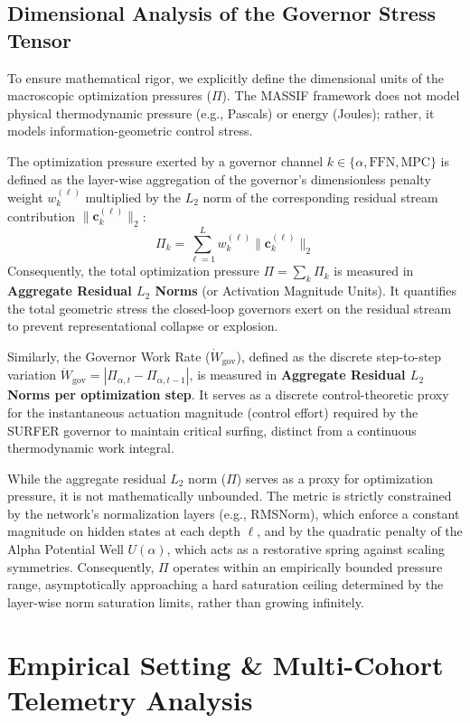 \documentclass[11pt]{article}
\begin{document}
\subsection{Dimensional Analysis of the Governor Stress Tensor}
To ensure mathematical rigor, we explicitly define the dimensional units of the macroscopic optimization pressures ($\Pi$). The MASSIF framework does not model physical thermodynamic pressure (e.g., Pascals) or energy (Joules); rather, it models information-geometric control stress.

The optimization pressure exerted by a governor channel $k \in \{\alpha, \text{FFN}, \text{MPC}\}$ is defined as the layer-wise aggregation of the governor's dimensionless penalty weight $w_k^{(\ell)}$ multiplied by the $L_2$ norm of the corresponding residual stream contribution $\|\mathbf{c}_k^{(\ell)}\|_2$:
\begin{equation}
\Pi_k = \sum_{\ell=1}^L w_k^{(\ell)} \|\mathbf{c}_k^{(\ell)}\|_2
\end{equation}
Consequently, the total optimization pressure $\Pi = \sum_k \Pi_k$ is measured in \textbf{Aggregate Residual $L_2$ Norms} (or Activation Magnitude Units). It quantifies the total geometric stress the closed-loop governors exert on the residual stream to prevent representational collapse or explosion.

Similarly, the Governor Work Rate ($\dot{W}_{\text{gov}}$), defined as the discrete step-to-step variation $\dot{W}_{\text{gov}} = |\Pi_{\alpha, t} - \Pi_{\alpha, t-1}|$, is measured in \textbf{Aggregate Residual $L_2$ Norms per optimization step}. It serves as a discrete control-theoretic proxy for the instantaneous actuation magnitude (control effort) required by the SURFER governor to maintain critical surfing, distinct from a continuous thermodynamic work integral.

While the aggregate residual $L_2$ norm ($\Pi$) serves as a proxy for optimization pressure, it is not mathematically unbounded. The metric is strictly constrained by the network's normalization layers (e.g., RMSNorm), which enforce a constant magnitude on hidden states at each depth $\ell$, and by the quadratic penalty of the Alpha Potential Well $U(\alpha)$, which acts as a restorative spring against scaling symmetries. Consequently, $\Pi$ operates within an empirically bounded pressure range, asymptotically approaching a hard saturation ceiling determined by the layer-wise norm saturation limits, rather than growing infinitely.

\section{Empirical Setting \& Multi-Cohort Telemetry Analysis}
\end{document}
